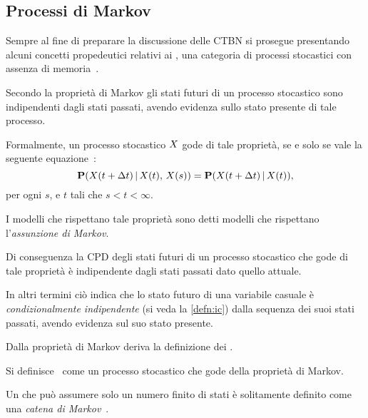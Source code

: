 \subsection{Processi di Markov}
\label{sec:mps}

Sempre al fine di preparare la discussione delle \acl{CTBN} si prosegue presentando alcuni concetti propedeutici relativi ai \mprocess{}, una categoria di processi stocastici con assenza di memoria~\citep{Loeve1978}.

\begin{definizione}
\label{defn:markov-assumption}
Secondo la proprietà di Markov gli stati futuri di un processo stocastico sono indipendenti dagli stati passati, avendo evidenza sullo stato presente di tale processo.

Formalmente, un processo stocastico $\mathnormal{X}$ gode di tale proprietà, se e solo se vale la seguente equazione~\citep{Loeve1978}:
\begin{equation}
\label{eq:markov-assumption}
\mathbf{P}(\mathnormal{X}(t + \Delta t)\,\arrowvert\,\mathnormal{X}(t),\,\mathnormal{X}(s))=\mathbf{P}(\mathnormal{X}(t + \Delta t)\,\arrowvert\,\mathnormal{X}(t))\text{,}
\end{equation}
per ogni $s$, e $t$ tali che $s < t < \infty$.

I modelli che rispettano tale proprietà sono detti modelli che rispettano l'\emph{assunzione di Markov}.
\end{definizione}

Di conseguenza la \acl{CPD} degli stati futuri di un processo stocastico che gode di tale proprietà è indipendente dagli stati passati dato quello attuale.

In altri termini ciò indica che lo stato futuro di una variabile casuale è \emph{condizionalmente indipendente} (si veda la \autoref{defn:ic}) dalla sequenza dei suoi stati passati, avendo evidenza sul suo stato presente.

Dalla proprietà di Markov deriva la definizione dei \mprocess{}.

\begin{definizione}[\upcase\mprocess*{}]
Si definisce~\citep{Loeve1978} come \mprocess*{} un processo stocastico che gode della proprietà di Markov.
\end{definizione}

\begin{definizione}
Un \mprocess*{} che può assumere solo un numero finito di stati è solitamente definito come una \emph{catena di Markov}~\citep[si veda][10]{Norris1998}.
\end{definizione}

